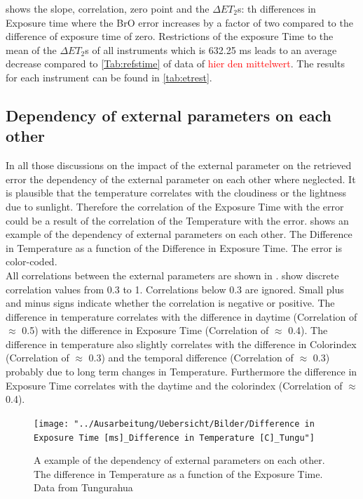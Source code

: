 \documentclass  [
  paper    = a4,
  BCOR     = 10mm,
  twoside,
  fontsize = 12pt,
  fleqn,
  toc      = bibnumbered,
  toc      = listofnumbered,
  numbers  = noendperiod,
  headings = normal,
  listof   = leveldown,
  version  = 3.03
]                                       {scrreprt}
\begin{document}
 shows the slope, correlation, zero point and the $\Delta ET_{2}$s: th differences in Exposure time where the BrO error increases by a factor of two compared to the difference of exposure time of zero.
Restrictions of the exposure Time to the mean of the $\Delta ET_{2}$s of all instruments which is 632.25 ms leads to an average decrease compared to \cref{Tab:refstime} of data of \textcolor{red}{ hier den mittelwert}. The results for each instrument can be found in \cref{tab:etrest}.


	\subsection*{Dependency of external parameters on each other}
	In all those discussions on the impact of the external parameter on the retrieved   error the  dependency of the external parameter on each other where neglected. It is plausible that the temperature correlates with the cloudiness or the lightness due to sunlight. Therefore the correlation of the Exposure Time with the   error could be a result of the correlation of the Temperature with the   error.  shows an example of the dependency of external parameters on each other. The Difference in Temperature as a function of the Difference in Exposure Time. The   error is color-coded. \\
	All correlations between the external parameters are shown in .  show discrete correlation values from 0.3 to 1. Correlations below 0.3 are ignored. Small plus and minus signs indicate whether the correlation is negative or positive. 
	The difference in temperature correlates with the difference in daytime (Correlation of $\approx$ 0.5) with the difference in Exposure Time (Correlation of $\approx$ 0.4). The difference in temperature also slightly correlates with the difference in Colorindex (Correlation of $\approx$ 0.3) and the temporal difference (Correlation of $\approx$ 0.3) probably due to long term changes in Temperature. Furthermore the difference in Exposure Time correlates with the daytime and the colorindex (Correlation of $\approx$ 0.4).\\
	\begin{figure}
		\centering
		\texttt{[image: "../Ausarbeitung/Uebersicht/Bilder/Difference in Exposure Time [ms]\_Difference in Temperature [C]\_Tungu"]}
		\caption{A example of the dependency of external parameters on each other. The difference in Temperature as a function of the Exposure Time. Data from Tungurahua}
		\label{fig:difference-in-exposure-time-msdifference-in-temperature-ctungu}
	\end{figure}
\end{document}

